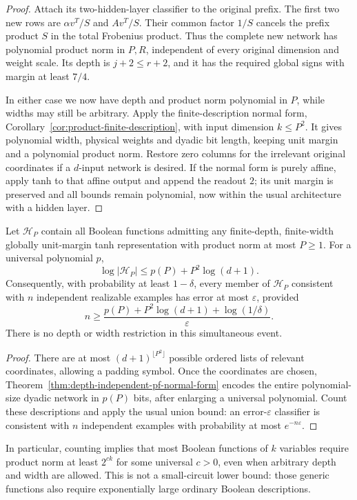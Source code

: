 \begin{proof}
Attach its two-hidden-layer classifier to the original prefix.
The first two new rows are $\alpha v^T/S$ and $Av^T/S$.
Their common factor $1/S$ cancels the prefix product $S$ in the
total Frobenius product. Thus the complete new network has polynomial
product norm in $P,R$, independent of every original dimension and
weight scale. Its depth is $j+2\le r+2$, and it has the required
global signs with margin at least $7/4$.

In either case we now have depth and product norm polynomial in $P$,
while widths may still be arbitrary. Apply the finite-description
normal form, Corollary~\ref{cor:product-finite-description}, with
input dimension $k\le P^2$. It gives polynomial width, physical
weights and dyadic bit length, keeping unit margin and a polynomial
product norm. Restore zero columns for the irrelevant original
coordinates if a $d$-input network is desired. If the normal form is
purely affine, apply tanh to that affine output and append the
readout $2$; its unit margin is preserved and all bounds remain
polynomial, now within the usual architecture with a hidden layer.
\end{proof}

\begin{corollary}
\label{cor:all-depth-pf-counting}
Let $\mathcal H_P$ contain all Boolean functions admitting any
finite-depth, finite-width globally unit-margin tanh representation
with product norm at most $P\ge1$. For a universal polynomial $p$,
\[
 \log|\mathcal H_P|\le p(P)+P^2\log(d+1).
\]
Consequently, with probability at least $1-\delta$, every member
of $\mathcal H_P$ consistent with $n$ independent realizable examples
has error at most $\varepsilon$, provided
\[
 n\ge\frac{p(P)+P^2\log(d+1)+\log(1/\delta)}{\varepsilon}.
\]
There is no depth or width restriction in this simultaneous event.
\end{corollary}

\begin{proof}
There are at most $(d+1)^{\lfloor P^2\rfloor}$ possible ordered
lists of relevant coordinates, allowing a padding symbol. Once the
coordinates are chosen, Theorem~\ref{thm:depth-independent-pf-normal-form}
encodes the entire polynomial-size dyadic network in $p(P)$ bits,
after enlarging a universal polynomial. Count these descriptions and
apply the usual union bound: an error-$\varepsilon$ classifier is
consistent with $n$ independent examples with probability at most
$e^{-n\varepsilon}$.
\end{proof}

In particular, counting implies that most Boolean functions of $k$
variables require product norm at least $2^{c k}$ for some universal
$c>0$, even when arbitrary depth and width are allowed. This is not
a small-circuit lower bound: those generic functions also require
exponentially large ordinary Boolean descriptions.
